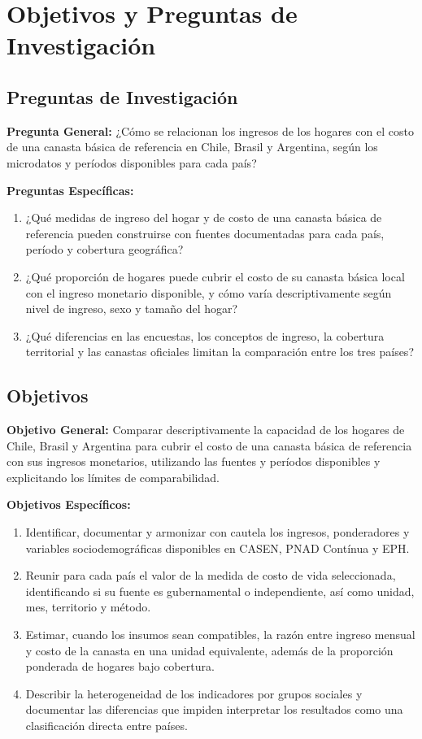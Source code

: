 \section{Objetivos y Preguntas de Investigación}

\subsection{Preguntas de Investigación}
\textbf{Pregunta General:}
¿Cómo se relacionan los ingresos de los hogares con el costo de una canasta básica de referencia en Chile, Brasil y Argentina, según los microdatos y períodos disponibles para cada país?

\textbf{Preguntas Específicas:}
\begin{enumerate}
    \item ¿Qué medidas de ingreso del hogar y de costo de una canasta básica de referencia pueden construirse con fuentes documentadas para cada país, período y cobertura geográfica?
    \item ¿Qué proporción de hogares puede cubrir el costo de su canasta básica local con el ingreso monetario disponible, y cómo varía descriptivamente según nivel de ingreso, sexo y tamaño del hogar?
    \item ¿Qué diferencias en las encuestas, los conceptos de ingreso, la cobertura territorial y las canastas oficiales limitan la comparación entre los tres países?
\end{enumerate}

\subsection{Objetivos}
\textbf{Objetivo General:}
Comparar descriptivamente la capacidad de los hogares de Chile, Brasil y Argentina para cubrir el costo de una canasta básica de referencia con sus ingresos monetarios, utilizando las fuentes y períodos disponibles y explicitando los límites de comparabilidad.

\textbf{Objetivos Específicos:}
\begin{enumerate}
    \item Identificar, documentar y armonizar con cautela los ingresos, ponderadores y variables sociodemográficas disponibles en CASEN, PNAD Contínua y EPH.
    \item Reunir para cada país el valor de la medida de costo de vida seleccionada, identificando si su fuente es gubernamental o independiente, así como unidad, mes, territorio y método.
    \item Estimar, cuando los insumos sean compatibles, la razón entre ingreso mensual y costo de la canasta en una unidad equivalente, además de la proporción ponderada de hogares bajo cobertura.
    \item Describir la heterogeneidad de los indicadores por grupos sociales y documentar las diferencias que impiden interpretar los resultados como una clasificación directa entre países.
\end{enumerate}